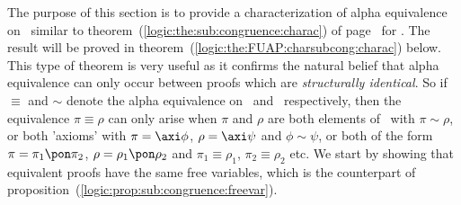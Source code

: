 The purpose of this section is to provide a characterization of 
alpha equivalence on \pvs\ similar to
theorem~(\ref{logic:the:sub:congruence:charac}) of
page~\pageref{logic:the:sub:congruence:charac} for \pv. The result
will be proved in theorem~(\ref{logic:the:FUAP:charsubcong:charac})
below. This type of theorem is very useful as it confirms the
natural belief that alpha equivalence can only occur between
proofs which are {\em structurally identical}. So if $\equiv$ and
$\sim$ denote the alpha equivalence on \pvs\ and \pv\
respectively, then the equivalence $\pi\equiv\rho$ can only arise
when $\pi$ and $\rho$ are both elements of \pv\ with $\pi\sim\rho$,
or both 'axioms' with $\pi=\axi\phi$, $\rho=\axi\psi$ and
$\phi\sim\psi$, or both of the form $\pi=\pi_{1}\pon\pi_{2}$,
$\rho=\rho_{1}\pon\rho_{2}$ and $\pi_{1}\equiv\rho_{1}$,
$\pi_{2}\equiv\rho_{2}$ etc. We start by showing that equivalent
proofs have the same free variables, which is the counterpart of
proposition~(\ref{logic:prop:sub:congruence:freevar}).

